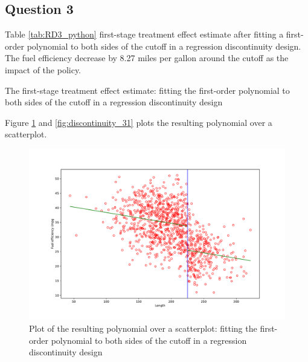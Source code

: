 \documentclass{article}
\begin{document}
\newpage

\subsection{Question 3 }

Table \ref{tab:RD3_python} first-stage treatment effect estimate after fitting a first-order polynomial to both sides of the cutoff in a regression discontinuity design. The fuel efficiency decrease by 8.27 miles per gallon around the cutoff as the impact of the policy.
\begin{table}[ht]
    \centering
    
    \caption{The first-stage treatment effect estimate: fitting the first-order polynomial to both sides of the cutoff in a regression discontinuity design}
    \label{tab:RD3_python}
\end{table}

Figure \ref{fig:discontinuity_3} and \ref{fig:discontinuity_31}  plots the resulting polynomial over a scatterplot.

\newpage

\begin{figure}[ht]
    \centering
    \includegraphics[scale = 0.6]{discontinuity_3.pdf}
    \caption{Plot of the resulting polynomial over a scatterplot: fitting the first-order polynomial to both sides of the cutoff in a regression discontinuity design}
    \label{fig:discontinuity_3}
\end{figure}
\end{document}
